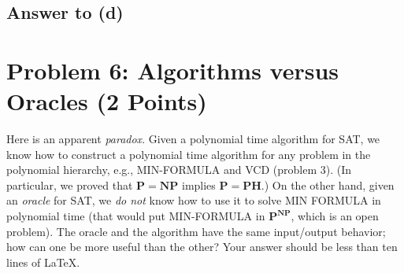 \documentclass{article}
\begin{document}

\subsection*{Answer to (d)}

\section*{Problem 6: Algorithms versus Oracles (2 Points)}

Here is an apparent {\em paradox}. Given a polynomial time algorithm for SAT, we know how to construct a polynomial time algorithm for any problem in the polynomial hierarchy, e.g., MIN-FORMULA and VCD (problem 3). (In particular, we proved that $\mathbf{P} = \mathbf{NP}$ implies $\mathbf{P} = \mathbf{PH}$.) On the other hand, given an \emph{oracle} for SAT, we \emph{do not} know how to use it to solve MIN FORMULA in polynomial time (that would put MIN-FORMULA in $\mathbf{P}^{\mathbf{NP}}$, which is an open problem). The oracle and the algorithm have the same input/output behavior; how can one be more useful than the other? Your answer should be less than ten lines of LaTeX.
\end{document}
